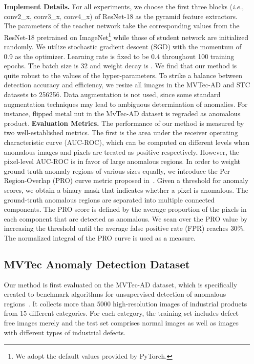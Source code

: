 \documentclass[final]{cvpr}
\begin{document}
{\noindent \textbf{Implement Details.} For all experiments, we choose the first three blocks (\textit{i.e.}, conv2\_x, conv3\_x, conv4\_x) of ResNet-18 as the pyramid feature extractors. The parameters of the teacher network take the corresponding values from the ResNet-18 pretrained on ImageNet\footnote{We adopt the default values provided by PyTorch.} while those of student network are initialized randomly. We utilize stochastic gradient descent (SGD) with the momentum of 0.9 as the optimizer. Learning rate is fixed to be 0.4 throughout 100 training epochs. The batch size is 32 and weight decay is . We find that our method is quite robust to the values of the hyper-parameters. To strike a balance between detection accuracy and efficiency, we resize all images in the MVTec-AD and STC datasets to 256256. Data augmentation is not used, since some standard augmentation techniques may lead to ambiguous determination of anomalies. For instance, flipped metal nut in the MvTec-AD dataset is regraded as anomalous product.
\noindent \textbf{Evaluation Metrics.} The performance of our method is measured by two well-established metrics. The first is the area under the receiver operating characteristic curve (AUC-ROC), which can be computed on different levels when anomalous images and pixels are treated as positive respectively. However,  the pixel-level AUC-ROC is in favor of large anomalous regions. In order to weight ground-truth anomaly regions of various sizes equally, we introduce the Per-Region-Overlap (PRO) curve metric proposed in~\cite{Bergmann2020}. Given a threshold for anomaly scores, we obtain a binary mask that indicates whether a pixel is anomalous. The ground-truth anomalous regions are separated into multiple connected components. The PRO score is defined by the average proportion of the pixels in each component that are detected as anomalous. We scan over the PRO value by increasing the threshold until the average false positive rate (FPR) reaches 30\%. The normalized integral of the PRO curve is used as a measure.


\subsection{MVTec Anomaly Detection Dataset}
\label{sec4-sub2}

Our method is first evaluated on the MVTec-AD dataset, which is specifically created to benchmark algorithms for unsupervised detection of anomalous regions~\cite{Bergmann2019}. It collects more than 5000 high-resolution images of industrial products from 15 different categories. For each category, the training set includes defect-free images merely and the test set comprises normal images as well as images with different types of industrial defects.

}
\end{document}

